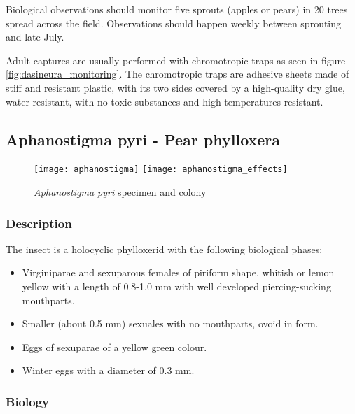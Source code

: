 Biological observations should monitor five sprouts (apples or pears) in 20 trees spread across the field. Observations should happen weekly between sprouting and late July.

Adult captures are usually performed with chromotropic traps as seen in figure \ref{fig:dasineura_monitoring}.  The chromotropic traps are adhesive sheets made of stiff and resistant plastic, with its two sides covered by a high-quality dry glue, water resistant, with no toxic substances and high-temperatures resistant.

\subsection{Aphanostigma pyri - Pear phylloxera}
\label{sec:problem_pests_filoxera}

\begin{figure}[htbp]
  \centering
    {\texttt{[image: aphanostigma]}}%
  \hfill
    {\texttt{[image: aphanostigma\_effects]}}%
  \caption{\textit{Aphanostigma pyri} specimen and colony}
  \label{fig:dasineura_figs}
\end{figure}

\subsubsection{Description}

The insect is a holocyclic phylloxerid with the following biological phases:
\begin{itemize}
	\item Virginiparae and sexuparous females of piriform shape, whitish or lemon yellow with a length of 0.8-1.0 mm with well developed piercing-sucking mouthparts.
	\item Smaller (about 0.5 mm) sexuales with no mouthparts, ovoid in form.
	\item Eggs of sexuparae of a yellow green colour.
	\item Winter eggs with a diameter of 0.3 mm.
\end{itemize}

\subsubsection{Biology}

